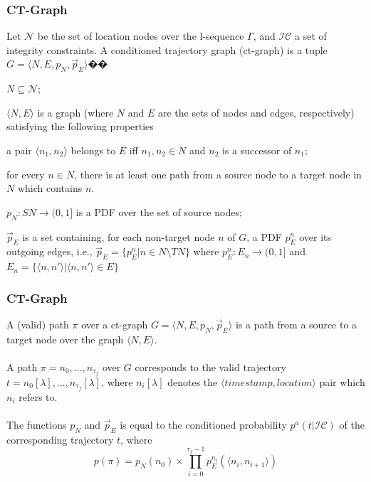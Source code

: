 \begin{frame}
\frametitle{CT-Graph}

\begin{definition}[CT-Graph]
  Let $\mathcal{N}$ be the set of location nodes over the l-sequence $\Gamma$, and $\mathcal{IC}$ a set of integrity constraints. A conditioned trajectory graph (ct-graph) is a tuple $G = \langle N, E, p_N, \vec{p}_E \rangle$��
  \begin{fitemize}
    \item $N \subseteq \mathcal{N}$;
    \item $\langle N,E \rangle$ is a graph (where $N$ and $E$ are the sets of nodes and edges, respectively) satisfying the following properties
      \begin{sitemize}
        \item a pair $\langle n_1, n_2 \rangle$ belongs to $E$ iff $n_1, n_2 \in N$ and $n_2$ is a successor of $n_1$;
        \item for every $n \in N$, there is at least one path from a source node to a target node in $N$ which contains $n$.
      \end{sitemize}
    \item $p_N: SN \rightarrow (0, 1]$ is a PDF over the set of source nodes;
    \item $\vec{p}_E$ is a set containing, for each non-target node $n$ of $G$, a PDF $p^n_E$ over its outgoing edges, i.e., $\vec{p}_E = \{ p^n_E | n \in N \setminus TN \}$ where $p^n_E: E_n \rightarrow (0,1]$ and $E_n = \{ \langle n, n' \rangle | \langle n, n' \rangle \in E \}$
  \end{fitemize}
\end{definition}

\end{frame}


\begin{frame}
\frametitle{CT-Graph}

A (valid) path $\pi$ over a ct-graph $G = \langle N,E,p_N,\vec{p}_E \rangle$ is a path from a source to a target node over the graph $\langle N,E \rangle$.\\~\\

A path $\pi = n_0, ..., n_{\tau_f}$ over $G$ corresponds to the valid trajectory $t = n_0[\lambda],...,n_{\tau_f}[\lambda]$, where $n_i[\lambda]$ denotes the $\langle timestamp, location \rangle$ pair which $n_i$ refers to.\\~\\

The functions $p_N$ and $\vec{p}_E$ is equal to the conditioned probability $p^a(t | \mathcal{IC})$ of the corresponding trajectory $t$, where
\begin{equation}
  p(\pi) = p_N(n_0) \times \prod_{i=0}^{\tau_f-1}p_E^{n_i}(\langle n_i, n_{i+1} \rangle)
\end{equation}

\end{frame}

